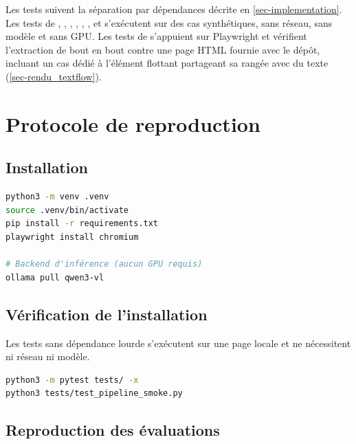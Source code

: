 {\sloppy
Les tests suivent la séparation par dépendances décrite en
\cref{sec-implementation}. Les tests de , ,
, , ,
,  et
 s'exécutent sur des cas synthétiques, sans
réseau, sans modèle et sans GPU. Les tests de 
s'appuient sur Playwright et vérifient l'extraction de bout en bout contre une
page HTML fournie avec le dépôt, incluant un cas dédié à l'élément
flottant partageant sa rangée avec du texte
(\cref{sec-rendu_textflow}).
\par}

\chapter{Protocole de reproduction}
\label{annexe-repro}

\section{Installation}

\begin{lstlisting}[language=bash, frame=single, basicstyle=\ttfamily\scriptsize]
python3 -m venv .venv
source .venv/bin/activate
pip install -r requirements.txt
playwright install chromium

# Backend d'inférence (aucun GPU requis)
ollama pull qwen3-vl
\end{lstlisting}

\section{Vérification de l'installation}

Les tests sans dépendance lourde s'exécutent sur une page locale et ne
nécessitent ni réseau ni modèle.

\begin{lstlisting}[language=bash, frame=single, basicstyle=\ttfamily\scriptsize]
python3 -m pytest tests/ -x
python3 tests/test_pipeline_smoke.py
\end{lstlisting}

\section{Reproduction des évaluations}

